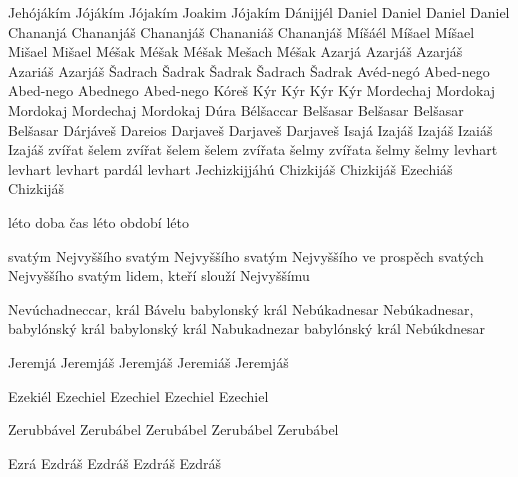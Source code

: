  {Jehójákím} {Jójákím} {Jójakím} {Joakim} {Jójakím}
 {Dánijjél} {Daniel} {Daniel} {Daniel} {Daniel}
 {Chananjá} {Chananjáš} {Chananjáš} {Chananiáš} {Chananjáš}
 {Míšáél} {Míšael} {Míšael} {Mišael} {Mišael}  %
 {Méšak} {Méšak} {Méšak} {Mešach} {Méšak}
 {Azarjá} {Azarjáš} {Azarjáš} {Azariáš} {Azarjáš}
 {Šadrach} {Šadrak} {Šadrak} {Šadrach} {Šadrak}
 {Avéd-negó} {Abed-nego} {Abed-nego} {Abednego} {Abed-nego} 
 {Kóreš} {Kýr} {Kýr} {Kýr} {Kýr}
 {Mordechaj} {Mordokaj} {Mordokaj} {Mordechaj} {Mordokaj}
 {} {} {Dúra} {} {} 
 {Bélšaccar} {Belšasar} {Belšasar} {Belšasar} {Belšasar}
 {Dárjáveš} {Dareios} {Darjaveš} {Darjaveš} {Darjaveš} %
 {Isajá} {Izajáš} {Izajáš} {Izaiáš} {Izajáš}
 {zvířat} {šelem} {zvířat} {šelem} {šelem}
 {zvířata} {šelmy} {zvířata} {šelmy} {šelmy}
 {levhart} {levhart} {levhart} {pardál} {levhart}
 {Jechizkijjáhú} {Chizkijáš} {Chizkijáš} {Ezechiáš} {Chizkijáš}

\vdef  
    {léto}   %
    {doba}   %
    {čas}   %
    {léto}   %
    {období}   %
    {léto}   %

 {svatým Nejvyššího} {svatým Nejvyššího} {svatým Nejvyššího} {ve prospěch svatých Nejvyššího} {svatým lidem, kteří slouží Nejvyššímu} 




       {Nevúchadneccar, král Bávelu}
       {babylonský král Nebúkadnesar}
       {Nebúkadnesar, babylónský král}
       {babylonský král Nabukadnezar}                  
       {babylónský král Nebúkdnesar}                        

        {Jeremjá} %
        {Jeremjáš} %
        {Jeremjáš} %
        {Jeremiáš} %
        {Jeremjáš} %

       {Ezekiél} %
       {Ezechiel} %
       {Ezechiel} %
       {Ezechiel} %
       {Ezechiel} %




       {Zerubbável} %
       {Zerubábel} %
       {Zerubábel} %
       {Zerubábel} %
       {Zerubábel} %

       {Ezrá} %
       {Ezdráš} %
       {Ezdráš} %
       {Ezdráš} %
       {Ezdráš} %

